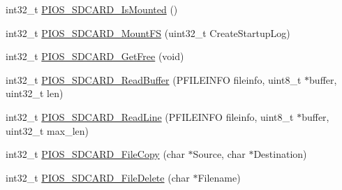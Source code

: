 \begin{DoxyCompactItemize}
\item 
int32\-\_\-t \hyperlink{group___p_i_o_s___s_d_c_a_r_d_gaeccd9489675f220997e2cd1bb825ab11}{\-P\-I\-O\-S\-\_\-\-S\-D\-C\-A\-R\-D\-\_\-\-Is\-Mounted} ()
\item 
int32\-\_\-t \hyperlink{group___p_i_o_s___s_d_c_a_r_d_ga72165efe2dd7fd31025395961c6d78f7}{\-P\-I\-O\-S\-\_\-\-S\-D\-C\-A\-R\-D\-\_\-\-Mount\-F\-S} (uint32\-\_\-t \-Create\-Startup\-Log)
\item 
int32\-\_\-t \hyperlink{group___p_i_o_s___s_d_c_a_r_d_gacb11ba0cff19017b7a01c2afc3c1d3cf}{\-P\-I\-O\-S\-\_\-\-S\-D\-C\-A\-R\-D\-\_\-\-Get\-Free} (void)
\item 
int32\-\_\-t \hyperlink{group___p_i_o_s___s_d_c_a_r_d_ga51efc027e8fdf9478c3fc7f0a33e4d7b}{\-P\-I\-O\-S\-\_\-\-S\-D\-C\-A\-R\-D\-\_\-\-Read\-Buffer} (\-P\-F\-I\-L\-E\-I\-N\-F\-O fileinfo, uint8\-\_\-t $\ast$buffer, uint32\-\_\-t len)
\item 
int32\-\_\-t \hyperlink{group___p_i_o_s___s_d_c_a_r_d_ga62d56f09b8671dcc6e51e5a917af7a5e}{\-P\-I\-O\-S\-\_\-\-S\-D\-C\-A\-R\-D\-\_\-\-Read\-Line} (\-P\-F\-I\-L\-E\-I\-N\-F\-O fileinfo, uint8\-\_\-t $\ast$buffer, uint32\-\_\-t max\-\_\-len)
\item 
int32\-\_\-t \hyperlink{group___p_i_o_s___s_d_c_a_r_d_ga8e032d776f07a10dd65fe1809087f1f6}{\-P\-I\-O\-S\-\_\-\-S\-D\-C\-A\-R\-D\-\_\-\-File\-Copy} (char $\ast$\-Source, char $\ast$\-Destination)
\item 
int32\-\_\-t \hyperlink{group___p_i_o_s___s_d_c_a_r_d_ga4a5ddda9425e947f6087000ab3161440}{\-P\-I\-O\-S\-\_\-\-S\-D\-C\-A\-R\-D\-\_\-\-File\-Delete} (char $\ast$\-Filename)
\end{DoxyCompactItemize}

